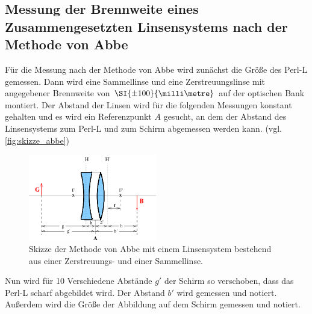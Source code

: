 \subsection{Messung der Brennweite eines Zusammengesetzten Linsensystems nach der Methode von Abbe}
\label{ssec:Durchführung_abbe}

Für die Messung nach der Methode von Abbe wird zunächst die Größe des Perl-L gemessen.
Dann wird eine Sammellinse und eine Zerstreuungslinse mit angegebener Brennweite von $\SI{\pm 100}{\milli\metre}$ auf der optischen Bank montiert.
Der Abstand der Linsen wird für die folgenden Messungen konstant gehalten und es wird ein Referenzpunkt $A$ gesucht, an dem der Abstand des Linsensystems zum Perl-L und zum Schirm abgemessen werden kann. (vgl. \autoref{fig:skizze_abbe})

\begin{figure}
    \centering
    \includegraphics[width=0.5\textwidth]{images/skizze_abbe.png}
    \caption{Skizze der Methode von Abbe mit einem Linsensystem bestehend aus einer Zerstreuungs- und einer Sammellinse. \cite{V408}}
    \label{fig:skizze_abbe}
\end{figure}

Nun wird für 10 Verschiedene Abstände $g'$ der Schirm so verschoben, dass das Perl-L scharf abgebildet wird.
Der Abstand $b'$ wird gemessen und notiert.
Außerdem wird die Größe der Abbildung auf dem Schirm gemessen und notiert.

